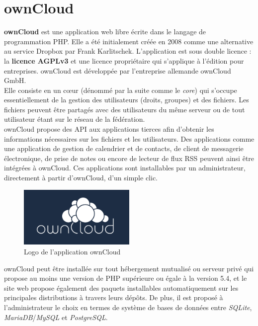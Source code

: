 \documentclass[10pt,a4paper, twoside]{report}
\begin{document}
	\section{ownCloud}
	\textbf{ownCloud} est une application web libre écrite dans le langage de programmation PHP. Elle a été initialement créée en 2008 comme une alternative au service Dropbox par Frank Karlitschek. L'application est sous double licence : la \textbf{licence AGPLv3} et une licence propriétaire qui s'applique à l'édition pour entreprises. ownCloud est développée par l'entreprise allemande ownCloud GmbH.
	\\
	
	Elle consiste en un cœur (dénommé par la suite comme le \textit{core}) qui s'occupe essentiellement de la gestion des utilisateurs (droits, groupes) et des fichiers. Les fichiers peuvent être partagés avec des utilisateurs du même serveur ou de tout utilisateur étant sur le réseau de la fédération.
	\\
	
	ownCloud propose des API aux applications tierces afin d'obtenir les informations nécessaires sur les fichiers et les utilisateurs. Des applications comme une application de gestion de calendrier et de contacts, de client de messagerie électronique, de prise de notes ou encore de lecteur de flux RSS peuvent ainsi être intégrées à ownCloud.
	Ces applications sont installables par un administrateur, directement à partir d'ownCloud, d'un simple clic.
	
	\begin{figure}[ht]
		\centering
		\includegraphics[width=0.5\textwidth]{images/owncloud-logo.png}
		\caption{Logo de l'application ownCloud}
		\label{normal_case}
	\end{figure}
	
	ownCloud peut être installée sur tout hébergement mutualisé ou serveur privé qui propose au moins une version de PHP supérieure ou égale à la version 5.4, et le site web propose également des paquets installables automatiquement sur les principales distributions à travers leurs dépôts. De plus, il est proposé à l'administrateur le choix en termes de système de bases de données entre \textit{SQLite}, \textit{MariaDB}/\textit{MySQL} et \textit{PostgreSQL}.
	
\end{document}
